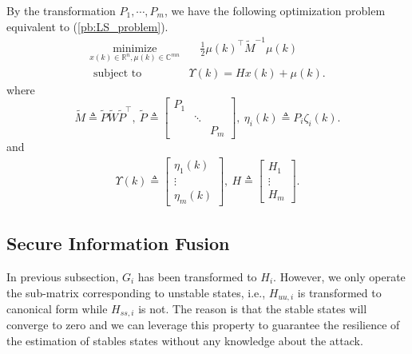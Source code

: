 \documentclass[journal]{IEEEtran}
\newcommand{\Rb}{{\mathbb{R}}}
\newcommand{\Cb}{{\mathbb{C}}}
\begin{document}
	By the transformation $P_1,\cdots,P_m$, we have the following optimization problem equivalent to (\ref{pb:LS_problem}).
	\begin{subequations}\label{pb:compact_least_square}
		\begin{align}
			\underset{{x}(k)\in \Rb^n, \mu(k)\in\Cb^{mn}}{\text{minimize}}&\quad \frac{1}{2} \mu(k)^{\top} \tilde{M}^{-1} \mu(k)   \\
			\text { subject to }\quad&
			\Upsilon (k)=
			H x(k)+\mu(k) .  
		\end{align}
	\end{subequations}
	where 
	\begin{equation}
		\tilde{M}\triangleq\tilde{P}\tilde{W}\tilde{P}^\top,\
		\tilde{P} \triangleq\left[\begin{array}{ccc}
			P_1 & & \\
			& \ddots & \\
			& & P_m
		\end{array}\right],\
		\eta_i(k)\triangleq P_i\zeta_{i}(k).
	\end{equation}
	and
	\begin{align}
		\Upsilon (k)\triangleq
		\begin{bmatrix}
			\eta_{1}(k) \\
			\vdots \\
			\eta_{m}(k)
		\end{bmatrix}, \
		H\triangleq\begin{bmatrix}
			H_{1} \\
			\vdots \\
			H_{m}
		\end{bmatrix} .	
	\end{align}
	
	
	\subsection{Secure Information Fusion}
	
	In previous subsection, $G_i$ has been transformed to $H_i$. 
	However, we only operate the sub-matrix corresponding to unstable states, i.e., $H_{uu,i}$ is transformed to canonical form while $H_{ss,i}$ is not.
	The reason is that the stable states will converge to zero and we can leverage this property to guarantee the resilience of the estimation of stables states without any knowledge about the attack.
	
\end{document}
